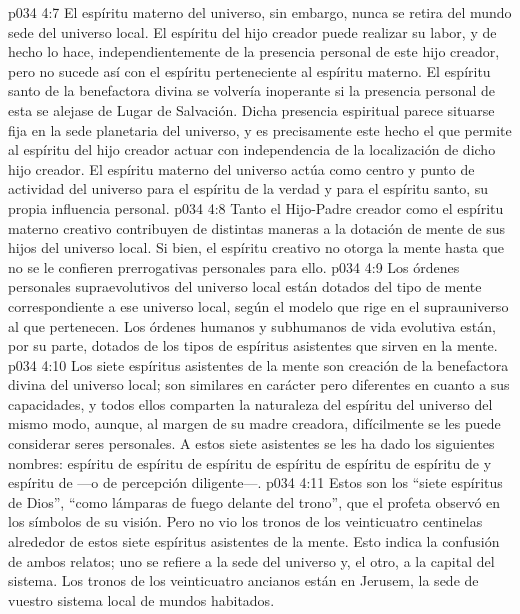 \vs p034 4:7 El espíritu materno del universo, sin embargo, nunca se retira del mundo sede del universo local. El espíritu del hijo creador puede realizar su labor, y de hecho lo hace, independientemente de la presencia personal de este hijo creador, pero no sucede así con el espíritu perteneciente al espíritu materno. El espíritu santo de la benefactora divina se volvería inoperante si la presencia personal de esta se alejase de Lugar de Salvación. Dicha presencia espiritual parece situarse fija en la sede planetaria del universo, y es precisamente este hecho el que permite al espíritu del hijo creador actuar con independencia de la localización de dicho hijo creador. El espíritu materno del universo actúa como centro y punto de actividad del universo para el espíritu de la verdad y para el espíritu santo, su propia influencia personal.
\vs p034 4:8 \pc Tanto el Hijo\hyp{}Padre creador como el espíritu materno creativo contribuyen de distintas maneras a la dotación de mente de sus hijos del universo local. Si bien, el espíritu creativo no otorga la mente hasta que no se le confieren prerrogativas personales para ello.
\vs p034 4:9 Los órdenes personales supraevolutivos del universo local están dotados del tipo de mente correspondiente a ese universo local, según el modelo que rige en el suprauniverso al que pertenecen. Los órdenes humanos y subhumanos de vida evolutiva están, por su parte, dotados de los tipos de espíritus asistentes que sirven en la mente.
\vs p034 4:10 \pc Los siete espíritus asistentes de la mente son creación de la benefactora divina del universo local; son similares en carácter pero diferentes en cuanto a sus capacidades, y todos ellos comparten la naturaleza del espíritu del universo del mismo modo, aunque, al margen de su madre creadora, difícilmente se les puede considerar seres personales. A estos siete asistentes se les ha dado los siguientes nombres: espíritu de  espíritu de  espíritu de  espíritu de  espíritu de  espíritu de  y espíritu de  ---o de percepción diligente---.
\vs p034 4:11 \pc Estos son los “siete espíritus de Dios”, “como lámparas de fuego delante del trono”, que el profeta observó en los símbolos de su visión. Pero no vio los tronos de los veinticuatro centinelas alrededor de estos siete espíritus asistentes de la mente. Esto indica la confusión de ambos relatos; uno se refiere a la sede del universo y, el otro, a la capital del sistema. Los tronos de los veinticuatro ancianos están en Jerusem, la sede de vuestro sistema local de mundos habitados.
